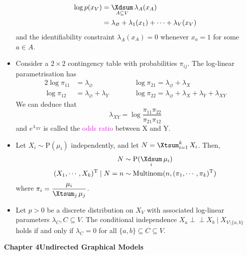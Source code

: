 \documentclass[UTF8]{book}
\DeclareMathOperator*{\Xsum}{\mathchoice{\Xdsum}{\Xtsum}{\Xtsum}{\Xtsum}}
\newcommand{\perpp}{\ensuremath{\perp\!\!\!\!\perp}}
\newcommand{\et}{&}
\newcommand{\concept}[1]{\textcolor{magenta}{#1}}
\renewcommand{\t}{\ensuremath{^\mathrm{T}}}
\begin{document}
\begin{itemize}
\begin{align*}
	\log p(x_V) \et = \Xsum_{A\subseteq V}\lambda_A(x_A)\\
	\et = \lambda_{\varnothing} + \lambda_1(x_1)+\cdots+\lambda_V(x_V)
\end{align*}
and the identifiability constraint $\lambda_A(x_A) = 0$ whenever $x_a = 1$ for some $a\in A$.
\item Consider a $2\times 2$ contingency table with probabilities $\pi_{ij}$. The log-linear parametrisation has
\begin{alignat*}{2}
\log\pi_{11} \et = \lambda_{\varnothing} \qquad \et\et\log\pi_{21}  = \lambda_{\varnothing} + \lambda_X \\
\log\pi_{12} \et = \lambda_{\varnothing} + \lambda_Y \qquad \et\et\log\pi_{22}  = \lambda_{\varnothing} + \lambda_X + \lambda_Y + \lambda_{XY}
\end{alignat*}
We can deduce that 
$$
\lambda_{XY} = \log\dfrac{\pi_{11}\pi_{22}}{\pi_{21}\pi_{12}}
$$
and $e^{\lambda_{XY}}$ is called the \concept{odds ratio} between X and Y.
\item Let $X_i\sim \mathrm{P}(\mu_i)$ independently, and let $N=\Xsum_{i=1}^k X_i$. Then,
\begin{align*}
	N \et \sim \mathrm{P}(\Xsum_i\mu_i)\\
	(X_1,\cdots,X_k)\t\mid N = n\et \sim \mathrm{Multinom}(n, (\pi_1,\cdots,\pi_k)\t)
\end{align*}
where $\pi_i = \dfrac{\mu_i}{\Xsum_j\mu_j}$.
\item Let $p>0$ be a discrete distribution on $X_V$ with associated log-linear parameters $\lambda_C, C\subseteq V$. The conditional independence $X_a\perpp X_b\mid X_{V\setminus\{a,b\}}$ holds if and only if $\lambda_C = 0$ for all $\{a,b\}\subseteq C\subseteq V$.
\end{itemize}
\large{\textbf{Chapter 4\quad Undirected Graphical Models}}
\end{document}
